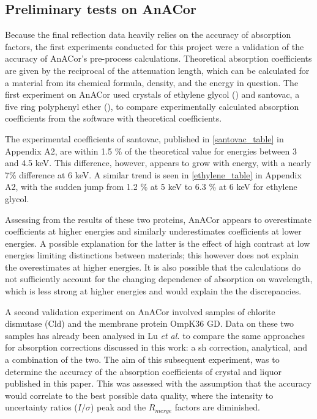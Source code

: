 \subsection{Preliminary tests on AnACor}



Because the final reflection data heavily relies on the accuracy of absorption factors, the first experiments conducted for this project were a validation of the accuracy of AnACor's pre-process calculations. Theoretical absorption coefficients are given by the reciprocal of the attenuation length, which can be calculated for a material from its chemical formula, density, and the energy in question. The first experiment on AnACor used crystals of ethylene glycol () and santovac, a five ring polyphenyl ether (), to compare experimentally calculated absorption coefficients from the software with theoretical coefficients.

The experimental coefficients of santovac, published in \cref{santovac_table} in Appendix A2, are within 1.5 \% of the theoretical value for energies between 3 and 4.5 \unit{keV}. This difference, however, appears to grow with energy, with a nearly 7\% difference at 6 \unit{keV}. A similar trend is seen in \cref{ethylene_table} in Appendix A2, with the sudden jump from 1.2 \% at 5 \unit{keV} to 6.3 \% at 6 \unit{keV} for ethylene glycol.

Assessing from the results of these two proteins, AnACor appears to overestimate coefficients at higher energies and similarly underestimates coefficients at lower energies. A possible explanation for the latter is the effect of high contrast at low energies limiting distinctions between materials; this however does not explain the overestimates at higher energies. It is also possible that the calculations do not sufficiently account for the changing dependence of absorption on wavelength, which is less strong at higher energies and would explain the the discrepancies.

A second validation experiment on AnACor involved samples of chlorite dismutase (Cld) and the membrane protein OmpK36 GD. Data on these two samples has already been analysed in Lu \textit{et al.} \cite{Lu} to compare the same approaches for absorption corrections discussed in this work: a \ac{sh} correction, analytical, and a combination of the two. The aim of this subsequent experiment, was to determine the accuracy of the absorption coefficients of crystal and liquor published in this paper. This was assessed with the assumption that the accuracy would correlate to the best possible data quality, where the intensity to uncertainty ratios ($I / \sigma$) peak and the $R_{merge}$ factors are diminished.

